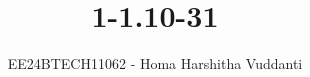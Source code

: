 \documentclass[journal]{IEEEtran}
\begin{document}

\vspace{3cm}

\title{1-1.10-31}
\author{EE24BTECH11062 - Homa Harshitha Vuddanti
}
{\let\newpage\relax\maketitle}

\renewcommand{\thefigure}{\theenumi}
\renewcommand{\thetable}{\theenumi}
\setlength{\intextsep}{10pt} %


\renewcommand{\thetable}{\theenumi}
\end{document}
